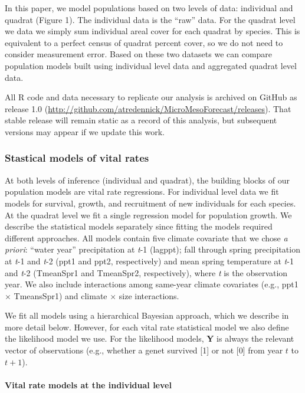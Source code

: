 \documentclass[12pt,]{article}
\begin{document}
In this paper, we model populations based on two levels of data:
individual and quadrat (Figure 1). The individual data is the ``raw''
data. For the quadrat level we data we simply sum individual areal cover
for each quadrat by species. This is equivalent to a perfect census of
quadrat percent cover, so we do not need to consider measurement error.
Based on these two datasets we can compare population models built using
individual level data and aggregated quadrat level data.

All R code and data necessary to replicate our analysis is archived on
GitHub as release 1.0
(\url{http://github.com/atredennick/MicroMesoForecast/releases}). That
stable release will remain static as a record of this analysis, but
subsequent versions may appear if we update this work.

\subsubsection{Stastical models of vital
rates}\label{stastical-models-of-vital-rates}

At both levels of inference (individual and quadrat), the building
blocks of our population models are vital rate regressions. For
individual level data we fit models for survival, growth, and
recruitment of new individuals for each species. At the quadrat level we
fit a single regression model for population growth. We describe the
statistical models separately since fitting the models required
different approaches. All models contain five climate covariate that we
chose \emph{a priori}: ``water year'' precipitation at \emph{t}-1
(lagppt); fall through spring precipitation at \emph{t}-1 and \emph{t}-2
(ppt1 and ppt2, respectively) and mean spring temperature at \emph{t}-1
and \emph{t}-2 (TmeanSpr1 and TmeanSpr2, respectively), where \emph{t}
is the observation year. We also include interactions among same-year
climate covariates (e.g., ppt1 $\times$ TmeansSpr1) and climate $\times$
size interactions.

We fit all models using a hierarchical Bayesian approach, which we
describe in more detail below. However, for each vital rate statistical
model we also define the likelihood model we use. For the likelihood
models, \textbf{Y} is always the relevant vector of observations (e.g.,
whether a genet survived {[}1{]} or not {[}0{]} from year $t$ to $t+1$).

\paragraph{Vital rate models at the individual
level}\label{vital-rate-models-at-the-individual-level}
\end{document}
